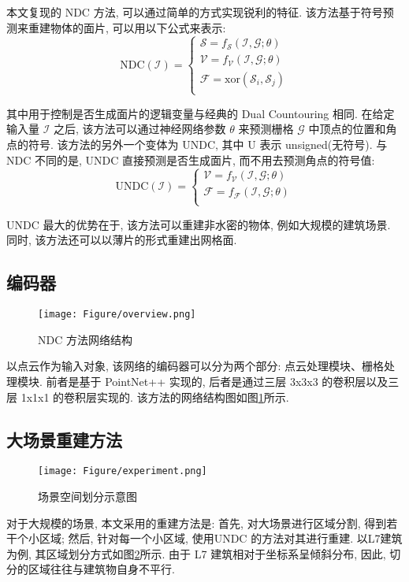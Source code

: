 本文复现的 NDC 方法, 可以通过简单的方式实现锐利的特征. 该方法基于符号预测来重建物体的面片, 可以用以下公式来表示: 
\begin{equation}
    \mathrm{NDC}(\mathcal{I}) =
		\begin{cases}
			\mathcal{S} = f_{\mathcal{S}}(\mathcal{I,G};\theta) \\
			\mathcal{V} = f_{\mathcal{V}}(\mathcal{I,G};\theta) \\
			\mathcal{F} = \mathrm{xor}(\mathcal{S}_i, \mathcal{S}_j) \\
		\end{cases}
\end{equation}

其中用于控制是否生成面片的逻辑变量与经典的 Dual Countouring 相同. 在给定输入量 $\mathcal{I}$ 之后, 该方法可以通过神经网络参数 $\theta$ 来预测栅格 $\mathcal{G}$ 中顶点的位置和角点的符号. 
该方法的另外一个变体为 UNDC, 其中 U 表示 unsigned(无符号). 与 NDC 不同的是, UNDC 直接预测是否生成面片, 而不用去预测角点的符号值: 
\begin{equation}
    \mathrm{UNDC}(\mathcal{I}) =
		\begin{cases}
			\mathcal{V} = f_{\mathcal{V}}(\mathcal{I,G};\theta) \\
			\mathcal{F} = f_{\mathcal{F}}(\mathcal{I,G};\theta) \\
		\end{cases}
\end{equation}

UNDC 最大的优势在于, 该方法可以重建非水密的物体, 例如大规模的建筑场景. 同时, 该方法还可以以薄片的形式重建出网格面. 

\subsection{编码器}
\begin{figure}[H]
	\center
	\texttt{[image: Figure/overview.png]}
	\centering
	\caption{NDC 方法网络结构}\label{fig:fig-net}
\end{figure}

以点云作为输入对象, 该网络的编码器可以分为两个部分: 点云处理模块、栅格处理模块. 
前者是基于 PointNet++\cite{qi2017pointnet++} 实现的, 后者是通过三层 3x3x3 的卷积层以及三层 1x1x1 的卷积层实现的. 该方法的网络结构图如图\ref{fig:fig-net}所示. 

\subsection{大场景重建方法}
\vspace{0.5em} %
\begin{figure}[H]
	\center
	\texttt{[image: Figure/experiment.png]}
	\centering
	\caption{场景空间划分示意图}\label{fig:fig-seg}
\end{figure}
对于大规模的场景, 本文采用的重建方法是: 
首先, 对大场景进行区域分割, 得到若干个小区域; 
然后, 针对每一个小区域, 使用UNDC 的方法对其进行重建. 
以L7建筑为例, 其区域划分方式如图\ref{fig:fig-seg}所示. 由于 L7 建筑相对于坐标系呈倾斜分布, 因此, 切分的区域往往与建筑物自身不平行. 

